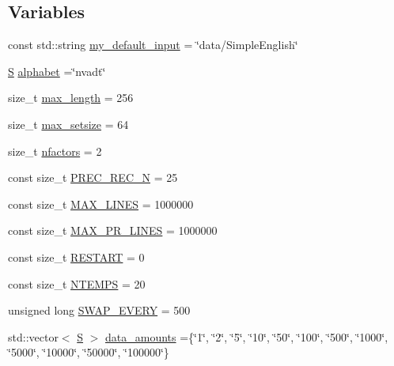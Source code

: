 \subsection*{Variables}
\begin{DoxyCompactItemize}
\item 
const std\+::string \hyperlink{_formal_language_theory-_complex_2_main_8cpp_aff5a98e66ee22e2c2547530190ecfd3d}{my\+\_\+default\+\_\+input} = \char`\"{}data/Simple\+English\char`\"{}
\item 
\hyperlink{_formal_language_theory-_complex_2_main_8cpp_a51c40915539205f0b5add30b0d68a4cb}{S} \hyperlink{_formal_language_theory-_complex_2_main_8cpp_ad762aabf5f551e4c7632fb389b3e2209}{alphabet} =\char`\"{}nvadt\char`\"{}
\item 
size\+\_\+t \hyperlink{_formal_language_theory-_complex_2_main_8cpp_aa94da4036d516add23ae35c670300c32}{max\+\_\+length} = 256
\item 
size\+\_\+t \hyperlink{_formal_language_theory-_complex_2_main_8cpp_aafa4cc7b8a249ecb81ad63ca7a2a6150}{max\+\_\+setsize} = 64
\item 
size\+\_\+t \hyperlink{_formal_language_theory-_complex_2_main_8cpp_abbce8dbfea6f30b87265ddd94cb933f7}{nfactors} = 2
\item 
const size\+\_\+t \hyperlink{_formal_language_theory-_complex_2_main_8cpp_a948185958f7efc05b85ac4084d82e3b9}{P\+R\+E\+C\+\_\+\+R\+E\+C\+\_\+N} = 25
\item 
const size\+\_\+t \hyperlink{_formal_language_theory-_complex_2_main_8cpp_a40344102d720622016c257aa59a33b6d}{M\+A\+X\+\_\+\+L\+I\+N\+ES} = 1000000
\item 
const size\+\_\+t \hyperlink{_formal_language_theory-_complex_2_main_8cpp_a5923038d8dfed7c8eaac4111396b490f}{M\+A\+X\+\_\+\+P\+R\+\_\+\+L\+I\+N\+ES} = 1000000
\item 
const size\+\_\+t \hyperlink{_formal_language_theory-_complex_2_main_8cpp_ada34ee41f51e229e0d5e00b99aed5991}{R\+E\+S\+T\+A\+RT} = 0
\item 
const size\+\_\+t \hyperlink{_formal_language_theory-_complex_2_main_8cpp_a6aa2c568bc3a4f1e1f586980b31b6699}{N\+T\+E\+M\+PS} = 20
\item 
unsigned long \hyperlink{_formal_language_theory-_complex_2_main_8cpp_a30d8f792c547d6073063d862794d030a}{S\+W\+A\+P\+\_\+\+E\+V\+E\+RY} = 500
\item 
std\+::vector$<$ \hyperlink{_formal_language_theory-_complex_2_main_8cpp_a51c40915539205f0b5add30b0d68a4cb}{S} $>$ \hyperlink{_formal_language_theory-_complex_2_main_8cpp_acb338cf650cba49a5be5dabfffad0dbd}{data\+\_\+amounts} =\{\char`\"{}1\char`\"{}, \char`\"{}2\char`\"{}, \char`\"{}5\char`\"{}, \char`\"{}10\char`\"{}, \char`\"{}50\char`\"{}, \char`\"{}100\char`\"{}, \char`\"{}500\char`\"{}, \char`\"{}1000\char`\"{}, \char`\"{}5000\char`\"{}, \char`\"{}10000\char`\"{}, \char`\"{}50000\char`\"{}, \char`\"{}100000\char`\"{}\}

\end{DoxyCompactItemize}
